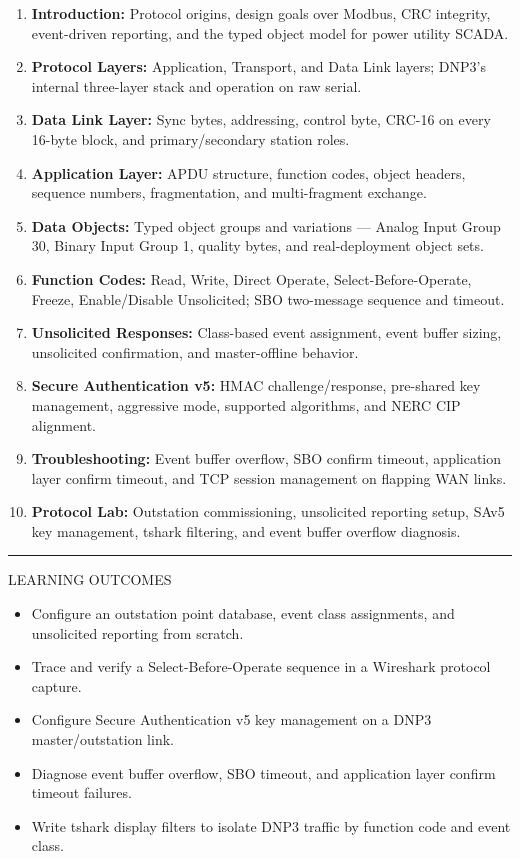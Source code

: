\documentclass[10pt]{article}
\begin{document}
\begin{enumerate}\small
  \item \textbf{Introduction:} Protocol origins, design goals over Modbus, CRC integrity, event-driven reporting, and the typed object model for power utility SCADA.
  \item \textbf{Protocol Layers:} Application, Transport, and Data Link layers; DNP3's internal three-layer stack and operation on raw serial.
  \item \textbf{Data Link Layer:} Sync bytes, addressing, control byte, CRC-16 on every 16-byte block, and primary/secondary station roles.
  \item \textbf{Application Layer:} APDU structure, function codes, object headers, sequence numbers, fragmentation, and multi-fragment exchange.
  \item \textbf{Data Objects:} Typed object groups and variations — Analog Input Group 30, Binary Input Group 1, quality bytes, and real-deployment object sets.
  \item \textbf{Function Codes:} Read, Write, Direct Operate, Select-Before-Operate, Freeze, Enable/Disable Unsolicited; SBO two-message sequence and timeout.
  \item \textbf{Unsolicited Responses:} Class-based event assignment, event buffer sizing, unsolicited confirmation, and master-offline behavior.
  \item \textbf{Secure Authentication v5:} HMAC challenge/response, pre-shared key management, aggressive mode, supported algorithms, and NERC CIP alignment.
  \item \textbf{Troubleshooting:} Event buffer overflow, SBO confirm timeout, application layer confirm timeout, and TCP session management on flapping WAN links.
  \item \textbf{Protocol Lab:} Outstation commissioning, unsolicited reporting setup, SAv5 key management, tshark filtering, and event buffer overflow diagnosis.
\end{enumerate}

\smallskip
{\color{dnavy}\rule{\linewidth}{0.4pt}}
\smallskip
{\small\sffamily\color{dgray}\MakeUppercase{Learning Outcomes}}
\smallskip

\begin{itemize}\small
  \item Configure an outstation point database, event class assignments, and unsolicited reporting from scratch.
  \item Trace and verify a Select-Before-Operate sequence in a Wireshark protocol capture.
  \item Configure Secure Authentication v5 key management on a DNP3 master/outstation link.
  \item Diagnose event buffer overflow, SBO timeout, and application layer confirm timeout failures.
  \item Write tshark display filters to isolate DNP3 traffic by function code and event class.
\end{itemize}
\end{document}
